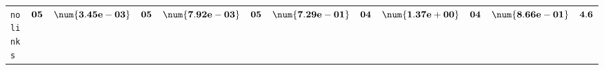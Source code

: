 \begin{xltabular}{\textwidth}{l||cC|cC|cC|cC|cC||c}
	\texttt{no links} & $\bf 05$ & $\bf \num{3.45e-03}$ & $\bf 05$ & $\bf \num{7.92e-03}$ & $\bf 05$ & $\bf \num{7.29e-01}$ & $\bf 04$ & $\bf \num{1.37e+00}$ & $\bf 04$ & $\bf \num{8.66e-01}$ & $\bf 4.6$  \\
\end{xltabular}
